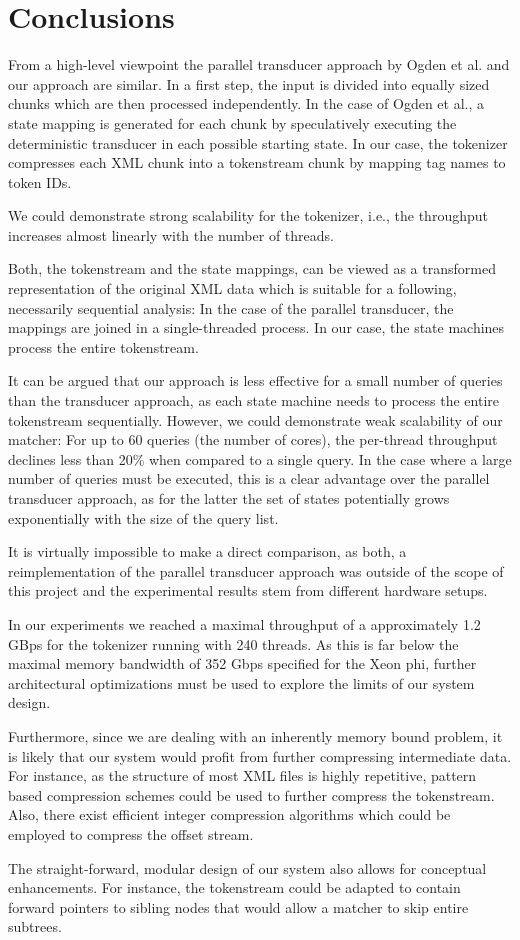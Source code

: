 \section{Conclusions}

From a high-level viewpoint the parallel transducer approach by Ogden et
al.\cite{Ogden2013} and our approach are similar. In a first step, the input is
divided into equally sized chunks which are then processed independently. In the
case of Ogden et al., a state mapping is generated for each chunk by
speculatively executing the deterministic transducer in each possible starting
state. In our case, the tokenizer compresses each XML chunk into a tokenstream
chunk by mapping tag names to token IDs.

We could demonstrate strong scalability for the tokenizer, i.e., the throughput
increases almost linearly with the number of threads.

Both, the tokenstream and the state mappings, can be viewed as a transformed
representation of the original XML data which is suitable for a following,
necessarily sequential analysis: In the case of the parallel transducer, the
mappings are joined in a single-threaded process. In our case, the state
machines process the entire tokenstream.

It can be argued that our approach is less effective for a small number of
queries than the transducer approach, as each state machine needs to process the
entire tokenstream sequentially. However, we could demonstrate weak scalability
of our matcher: For up to 60 queries (the number of cores), the per-thread
throughput declines less than 20\% when compared to a single query. In the case
where a large number of queries must be executed, this is a clear advantage over
the parallel transducer approach, as for the latter the set of states
potentially grows exponentially with the size of the query list.

It is virtually impossible to make a direct comparison, as both, a
reimplementation of the parallel transducer approach was outside of the scope of
this project and the experimental results stem from different hardware setups.

In our experiments we reached a maximal throughput of a approximately 1.2 GBps
for the tokenizer running with 240 threads. As this is far below the maximal
memory bandwidth of 352 Gbps specified for the Xeon phi\cite{IntelXeon},
further architectural optimizations must be used to explore the limits of our system
design.

Furthermore, since we are dealing with an inherently memory bound problem, it is
likely that our system would profit from further compressing intermediate data.
For instance, as the structure of most XML files is highly repetitive, pattern
based compression schemes could be used to further compress the tokenstream.
Also, there exist efficient integer compression algorithms which could be
employed to compress the offset stream\cite{Lemire2014}.

The straight-forward, modular design of our system also allows for conceptual
enhancements. For instance, the tokenstream could be adapted to contain forward
pointers to sibling nodes that would allow a matcher to skip entire subtrees.
